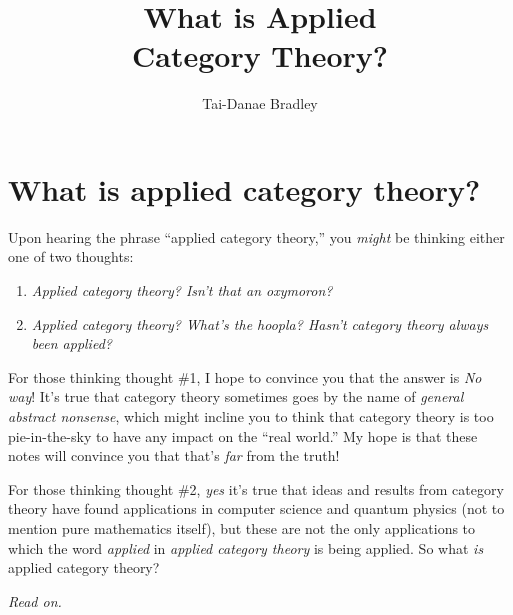 \documentclass{tufte-handout-tai}
\title{What is Applied \\ \noindent Category Theory?}
\author{Tai-Danae Bradley}
\theoremstyle{plain}
\theoremstyle{definition}
\theoremstyle{remark}
\begin{document}
\maketitlepage

\section*{What is applied category theory?}
\begin{fullwidth}
Upon hearing the phrase ``applied category theory,'' you \textit{might} be thinking either one of two thoughts:

	\begin{enumerate}[\#1]
		\item \textit{Applied category theory? Isn't that an oxymoron?}
		\item \textit{Applied category theory? What's the hoopla? Hasn't category theory always been applied?}
	\end{enumerate}

For those thinking thought \#1, I hope to convince you that the answer is \textit{No way}! It's true that category theory sometimes goes by the name of \textit{general abstract nonsense}, which might incline you to think that category theory is too pie-in-the-sky to have any impact on the ``real world.'' My hope is that these notes will convince you that that's \textit{far} from the truth!

For those thinking thought \#2, \textit{yes} it's true that ideas and results from category theory have found applications in computer science and quantum physics (not to mention pure mathematics itself), but these are not the only applications to which the word \textit{applied} in \textit{applied category theory} is being applied. So what \textit{is} applied category theory?

\vspace{.4cm}

\noindent \textit{Read on.} 
\end{fullwidth}


\end{document}
